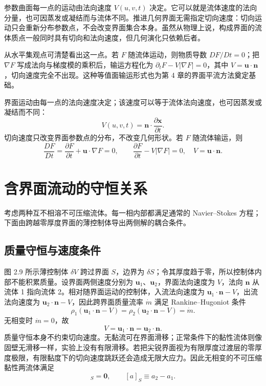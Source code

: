 \documentclass[11pt,a4paper,openany,fontset=none]{ctexbook}
\newenvironment{sourceblock}
  {\par\addvspace{0.65\baselineskip}\noindent\begin{minipage}{\linewidth}\centering}
  {\end{minipage}\par\addvspace{0.48\baselineskip}}
\begin{document}
\begin{sourceblock}
\end{sourceblock}

参数曲面每一点的运动由法向速度 $V(u,v,t)$ 决定。它可以就是流体速度的法向分量，也可因蒸发或凝结而与流体不同。推进几何界面无需指定切向速度：切向运动只会重新分布参数点，不会改变界面集合本身。虽然从物理上说，构成界面的流体质点一般同时具有切向和法向速度，但几何演化只依赖后者。

从水平集观点可清楚看出这一点。若 $F$ 随流体运动，则物质导数 $DF/Dt=0$；把 $\nabla F$ 写成法向与梯度模的乘积后，输运方程化为 $\partial_tF-V|\nabla F|=0$，其中 $V=\bm u\cdot\bm n$，切向速度完全不出现。这种等值面输运形式也为第 4 章的界面平流方法奠定基础。

界面运动由每一点的法向速度决定；该速度可以等于流体法向速度，也可因蒸发或凝结而不同：
\begin{equation}
 V(u,v,t)=\bm n\cdot\frac{\partial\bm x}{\partial t}. \tag{2.43}
\end{equation}
切向速度只改变界面参数点的分布，不改变几何形状。若 $F$ 随流体输运，则
\begin{equation}
 \frac{DF}{Dt}=\frac{\partial F}{\partial t}+\bm u\cdot\nabla F=0,\qquad
 \frac{\partial F}{\partial t}-V|\nabla F|=0,\quad V=\bm u\cdot\bm n. \tag{2.44--2.45}
\end{equation}

\section{含界面流动的守恒关系}


考虑两种互不相溶不可压缩流体。每一相内部都满足通常的 Navier--Stokes 方程；下面由跨越零厚度界面的薄控制体导出两侧解的耦合条件。

\subsection{质量守恒与速度条件}

图 2.9 所示薄控制体 $\delta V$ 跨过界面 $S$，边界为 $\delta S$；令其厚度趋于零，所以控制体内部不能积累质量。设界面两侧速度分别为 $\bm u_1$、$\bm u_2$，界面法向速度为 $V$，法向 $\bm n$ 从流体 1 指向流体 2。相对随界面运动的控制体，入流法向速度为 $\bm u_1\cdot\bm n-V$，出流法向速度为 $\bm u_2\cdot\bm n-V$，因此跨界面质量流率 $\dot m$ 满足 Rankine--Hugoniot 条件
\begin{equation}
 \rho_1(\bm u_1\cdot\bm n-V)=\rho_2(\bm u_2\cdot\bm n-V)=\dot m. \tag{2.46}
\end{equation}
无相变时 $\dot m=0$，故
\begin{equation}
 V=\bm u_1\cdot\bm n=\bm u_2\cdot\bm n. \tag{2.47}
\end{equation}
质量守恒本身不约束切向速度。无黏流可在界面滑移；正常条件下的黏性流体则像固壁无滑移一样，实验上没有有限滑移。若把尖锐界面视为有限厚度过渡层的零厚度极限，有限黏度下的切向速度跳跃还会造成无限大应力。因此无相变的不可压缩黏性两流体满足
\begin{equation}
 [\bm u]_S=\bm0,\qquad [a]_S\equiv a_2-a_1. \tag{2.48}
\end{equation}
\end{document}
